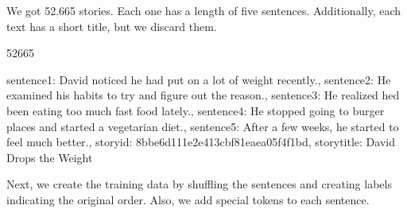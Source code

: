 \documentclass[letterpaper,10pt,english]{jupyterBook}
\begin{document}
\sphinxAtStartPar
We got 52.665 stories. Each one has a length of five sentences. Additionally, each text has a short title, but we discard them.
\begin{sphinxVerbatimInput}

\begin{sphinxVerbatim}[commandchars=\\\{\}]
\end{sphinxVerbatim}
\end{sphinxVerbatimInput}
\begin{sphinxVerbatimOutput}

\begin{sphinxVerbatim}[commandchars=\\\{\}]
52665
\end{sphinxVerbatim}
\end{sphinxVerbatimOutput}
\begin{sphinxVerbatimInput}

\begin{sphinxVerbatim}[commandchars=\\\{\}]
\PYG{p}{[}\PYG{p}{]}
\end{sphinxVerbatim}
\end{sphinxVerbatimInput}
\begin{sphinxVerbatimOutput}

\begin{sphinxVerbatim}[commandchars=\\\{\}]
\PYGZob{}\PYGZsq{}sentence1\PYGZsq{}: \PYGZsq{}David noticed he had put on a lot of weight recently.\PYGZsq{},
 \PYGZsq{}sentence2\PYGZsq{}: \PYGZsq{}He examined his habits to try and figure out the reason.\PYGZsq{},
 \PYGZsq{}sentence3\PYGZsq{}: \PYGZdq{}He realized he\PYGZsq{}d been eating too much fast food lately.\PYGZdq{},
 \PYGZsq{}sentence4\PYGZsq{}: \PYGZsq{}He stopped going to burger places and started a vegetarian \PYGZsq{}
              \PYGZsq{}diet.\PYGZsq{},
 \PYGZsq{}sentence5\PYGZsq{}: \PYGZsq{}After a few weeks, he started to feel much better.\PYGZsq{},
 \PYGZsq{}storyid\PYGZsq{}: \PYGZsq{}8bbe6d11\PYGZhy{}1e2e\PYGZhy{}413c\PYGZhy{}bf81\PYGZhy{}eaea05f4f1bd\PYGZsq{},
 \PYGZsq{}storytitle\PYGZsq{}: \PYGZsq{}David Drops the Weight\PYGZsq{}\PYGZcb{}
\end{sphinxVerbatim}
\end{sphinxVerbatimOutput}

\sphinxAtStartPar
Next, we create the training data by shuffling the sentences and creating labels indicating the original order. Also, we add special tokens to each sentence.
\end{document}

